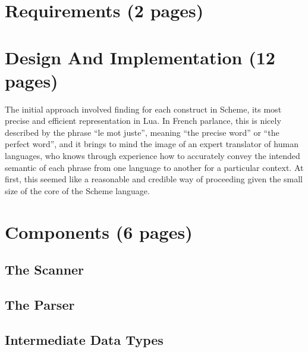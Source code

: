 \section{Requirements (2 pages)}


\section{Design And Implementation (12 pages)}

The initial approach involved finding for each construct in Scheme, its most
precise and efficient representation in Lua. In French parlance, this is nicely
described by the phrase ``le mot juste'', meaning ``the precise word'' or ``the
perfect word'', and it brings to mind the image of an expert translator of
human languages, who knows through experience how to accurately convey the
intended semantic of each phrase from one language to another for a particular
context.  At first, this seemed like a reasonable and credible way of
proceeding given the small size of the core of the Scheme language.


\section{Components (6 pages)}

\subsection{The Scanner}

\subsection{The Parser}

\subsection{Intermediate Data Types}

